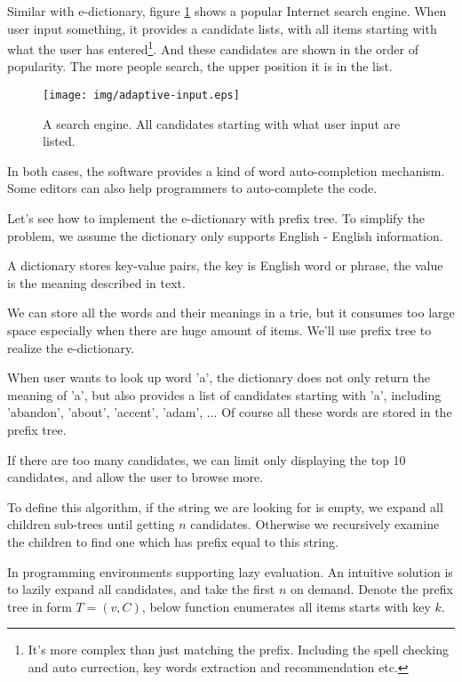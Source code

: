\documentclass[b5paper]{article}
\begin{document}
Similar with e-dictionary, figure \ref{fig:word-completion} shows a popular
Internet search engine. When user input something, it provides a candidate
lists, with all items starting with what the user has entered\footnote{It's more complex than just matching the prefix. Including the spell checking and auto currection, key words extraction and recommendation etc.}. And these candidates
are shown in the order of popularity. The more people search, the
upper position it is in the list.

\begin{figure}[htbp]
  \centering
  \texttt{[image: img/adaptive-input.eps]}
  \caption{A search engine. All candidates starting with what user input are listed.}
  \label{fig:word-completion}
\end{figure}

In both cases, the software provides a kind of word auto-completion mechanism.
Some editors can also help programmers to auto-complete the code.

Let's see how to implement the e-dictionary with prefix tree.
To simplify the problem, we assume the dictionary only supports English - English
information.

A dictionary stores key-value pairs, the key is English
word or phrase, the value is the meaning described in text.

We can store all the words and their meanings in a trie, but it consumes
too large space especially when there are huge amount of items. We'll use
prefix tree to realize the e-dictionary.

When user wants to look up word 'a', the dictionary does not only
return the meaning of 'a', but also provides a list of
candidates starting with 'a', including 'abandon', 'about',
'accent', 'adam', ... Of course all these words are stored in the prefix tree.

If there are too many candidates, we can limit only displaying the top 10
candidates, and allow the user to browse more.

To define this algorithm, if the string we
are looking for is empty, we expand all children sub-trees until getting $n$
candidates. Otherwise we recursively examine the children to
find one which has prefix equal to this string.

In programming environments supporting lazy evaluation. An intuitive
solution is to lazily expand all candidates, and take the first $n$ on
demand. Denote the prefix tree in form $T = (v, C)$,
below function enumerates all items starts with key $k$.
\end{document}
